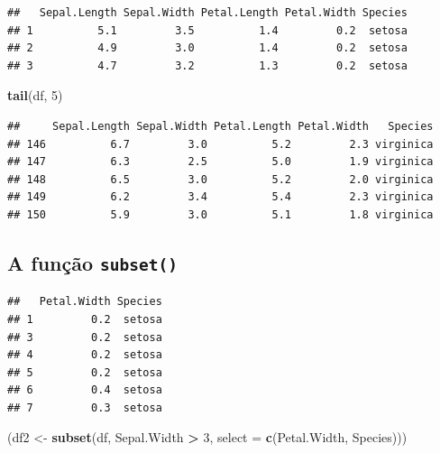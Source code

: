 \documentclass[
]{book}
\newenvironment{Shaded}{\begin{snugshade}}{\end{snugshade}}
\newcommand{\AttributeTok}[1]{\textcolor[rgb]{0.13,0.29,0.53}{#1}}
\newcommand{\DecValTok}[1]{\textcolor[rgb]{0.00,0.00,0.81}{#1}}
\newcommand{\FunctionTok}[1]{\textcolor[rgb]{0.13,0.29,0.53}{\textbf{#1}}}
\newcommand{\NormalTok}[1]{#1}
\newcommand{\OtherTok}[1]{\textcolor[rgb]{0.56,0.35,0.01}{#1}}
\newcommand{\SpecialCharTok}[1]{\textcolor[rgb]{0.81,0.36,0.00}{\textbf{#1}}}
\newcommand{\StringTok}[1]{\textcolor[rgb]{0.31,0.60,0.02}{#1}}
\begin{document}
\begin{verbatim}
##   Sepal.Length Sepal.Width Petal.Length Petal.Width Species
## 1          5.1         3.5          1.4         0.2  setosa
## 2          4.9         3.0          1.4         0.2  setosa
## 3          4.7         3.2          1.3         0.2  setosa
\end{verbatim}

\begin{Shaded}
\begin{Highlighting}[]
\FunctionTok{tail}\NormalTok{(df, }\DecValTok{5}\NormalTok{)}
\end{Highlighting}
\end{Shaded}

\begin{verbatim}
##     Sepal.Length Sepal.Width Petal.Length Petal.Width   Species
## 146          6.7         3.0          5.2         2.3 virginica
## 147          6.3         2.5          5.0         1.9 virginica
## 148          6.5         3.0          5.2         2.0 virginica
## 149          6.2         3.4          5.4         2.3 virginica
## 150          5.9         3.0          5.1         1.8 virginica
\end{verbatim}

\subsection{\texorpdfstring{A função \texttt{subset()}}{A função subset()}}\label{a-funuxe7uxe3o-subset}

\begin{Shaded}
\end{Shaded}

\begin{verbatim}
##   Petal.Width Species
## 1         0.2  setosa
## 3         0.2  setosa
## 4         0.2  setosa
## 5         0.2  setosa
## 6         0.4  setosa
## 7         0.3  setosa
\end{verbatim}

\begin{Shaded}
\begin{Highlighting}[]
\NormalTok{(df2 }\OtherTok{\textless{}{-}} \FunctionTok{subset}\NormalTok{(df, Sepal.Width }\SpecialCharTok{\textgreater{}} \DecValTok{3}\NormalTok{, }\AttributeTok{select =} \FunctionTok{c}\NormalTok{(Petal.Width, Species)))}
\end{Highlighting}
\end{Shaded}
\end{document}

